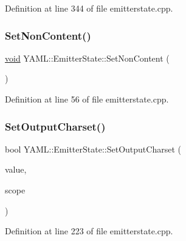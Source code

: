 Definition at line 344 of file emitterstate.\+cpp.

\mbox{\label{class_y_a_m_l_1_1_emitter_state_a50b3410c8739d81541bf290fc5f2f46b}} 
\subsubsection{\texorpdfstring{SetNonContent()}{SetNonContent()}}
{\footnotesize\ttfamily \mbox{\hyperlink{glad_8h_a950fc91edb4504f62f1c577bf4727c29}{void}} Y\+A\+M\+L\+::\+Emitter\+State\+::\+Set\+Non\+Content (\begin{DoxyParamCaption}{ }\end{DoxyParamCaption})}



Definition at line 56 of file emitterstate.\+cpp.

\mbox{\label{class_y_a_m_l_1_1_emitter_state_ad86c747b2fd2ac6c1c8c5e0b9cabea01}} 
\subsubsection{\texorpdfstring{SetOutputCharset()}{SetOutputCharset()}}
{\footnotesize\ttfamily bool Y\+A\+M\+L\+::\+Emitter\+State\+::\+Set\+Output\+Charset (\begin{DoxyParamCaption}\item[{\mbox{\hyperlink{namespace_y_a_m_l_a67c320aa50d3de7ecba1d0b8775dd684}{E\+M\+I\+T\+T\+E\+R\+\_\+\+M\+A\+N\+IP}}}]{value,  }\item[{\mbox{\hyperlink{struct_y_a_m_l_1_1_fmt_scope_a58c967eadfafdc79f62cd5c59ec2b1fe}{Fmt\+Scope\+::value}}}]{scope }\end{DoxyParamCaption})}



Definition at line 223 of file emitterstate.\+cpp.

\mbox{\label{class_y_a_m_l_1_1_emitter_state_abc3cb1c6667f6c7ad6f2720235e96c9b}} 
